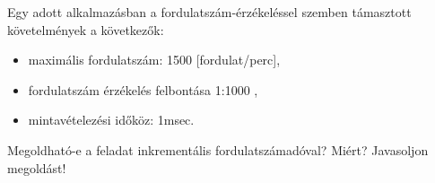 \begin{example}

Egy adott alkalmazásban a fordulatszám-érzékeléssel szemben támasztott követelmények a következők:
\begin{itemize}
\item{} maximális fordulatszám: 1500 [fordulat/perc],
\item{} fordulatszám érzékelés felbontása 1:1000 ,
\item{} mintavételezési időköz: 1msec.
\end{itemize}
Megoldható-e a feladat inkrementális fordulatszámadóval? Miért? Javasoljon megoldást!

\tcbline
\vspace{1mm}

\solution

\end{example}